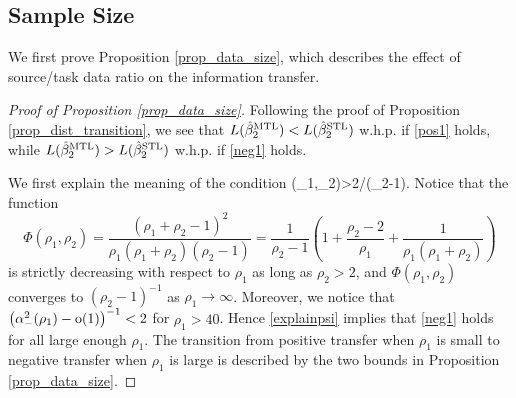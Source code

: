 \subsection{Sample Size} \label{app_proof_32}
We first prove Proposition \ref{prop_data_size}, which describes the effect of source/task data ratio on the information transfer. 

\begin{proof}[Proof of Proposition \ref{prop_data_size}]
Following the proof of Proposition \ref{prop_dist_transition}, we see that $L(\hat{\beta}_2^{\text{MTL}})< L(\hat{\beta}_2^{\text{STL}})$ w.h.p. if \eqref{pos1} holds, while $L(\hat{\beta}_2^{\text{MTL}})>L(\hat{\beta}_2^{\text{STL}})$ w.h.p. if \eqref{neg1} holds. 

We first explain the meaning of the condition 
\be\label{explainpsi}\Psi(\beta_1,\beta_2)>2/(\rho_2-1).\ee 
Notice that the function
$$ \Phi(\rho_1, \rho_2)=\frac{(\rho_1 + \rho_2 - 1)^2}{\rho_1 (\rho_1 + \rho_2) (\rho_2 - 1)}=\frac{1}{\rho_2-1} \left(1 +\frac{\rho_2-2}{\rho_1}+\frac{1}{\rho_1(\rho_1+\rho_2)}\right)$$
is strictly decreasing with respect to $\rho_1$ as long as $\rho_2> 2$, and $ \Phi(\rho_1, \rho_2)$ converges to $(\rho_2-1)^{-1}$ as $\rho_1\to \infty$.  Moreover, we notice that $\left( \alpha_-^2(\rho_1) -  \operatorname{o}(1) \right)^{-1} < 2$ for $\rho_1>40$. Hence \eqref{explainpsi} implies that \eqref{neg1} holds for all  large enough $\rho_1$. The transition from positive transfer when $\rho_1$ is small to negative transfer when $\rho_1$ is large is described by the two bounds in Proposition \ref{prop_data_size}.
 



\end{proof}
